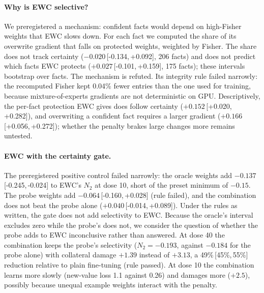 \documentclass[11pt]{article}
\newcommand{\NTwo}{\ensuremath{N_2}}
\newcommand{\ci}[2]{\,[#1,\,#2]}
\begin{document}
\paragraph{Why is EWC selective?}
We preregistered a mechanism: confident facts would depend on high-Fisher weights that EWC slows down.
For each fact we computed the share of its overwrite gradient that falls on protected weights, weighted by Fisher.
The share does not track certainty ($-0.020$\ci{-0.134}{+0.092}, 206 facts) and does not predict which facts EWC protects ($+0.027$\ci{-0.101}{+0.159}, 175 facts); these intervals bootstrap over facts.
The mechanism is refuted.
Its integrity rule failed narrowly: the recomputed Fisher kept 0.04\% fewer entries than the one used for training, because mixture-of-experts gradients are not deterministic on GPU.
Descriptively, the per-fact protection EWC gives does follow certainty ($+0.152$\ci{+0.020}{+0.282}), and overwriting a confident fact requires a larger gradient ($+0.166$\ci{+0.056}{+0.272}); whether the penalty brakes large changes more remains untested.

\paragraph{EWC with the certainty gate.}
The preregistered positive control failed narrowly: the oracle weights add $-0.137$\ci{-0.245}{-0.024} to EWC's \NTwo{} at dose 10, short of the preset minimum of $-0.15$.
The probe weights add $-0.064$\ci{-0.160}{+0.028} (rule failed), and the combination does not beat the probe alone ($+0.040$\ci{-0.014}{+0.089}).
Under the rules as written, the gate does not add selectivity to EWC. Because the oracle's interval excludes zero while the probe's does not, we consider the question of whether the probe adds to EWC inconclusive rather than answered.
At dose 40 the combination keeps the probe's selectivity ($\NTwo=-0.193$, against $-0.184$ for the probe alone) with collateral damage $+1.39$ instead of $+3.13$, a 49\%\ci{45\%}{55\%} reduction relative to plain fine-tuning (rule passed).
At dose 10 the combination learns more slowly (new-value loss 1.1 against 0.26) and damages more ($+2.5$), possibly because unequal example weights interact with the penalty.
\end{document}
